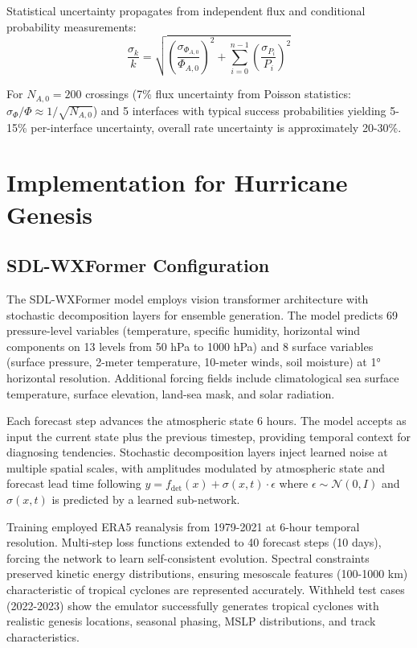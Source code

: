\documentclass[11pt]{article}
\begin{document}
Statistical uncertainty propagates from independent flux and conditional probability measurements:
\begin{equation}
\frac{\sigma_k}{k} = \sqrt{\left(\frac{\sigma_{\Phi_{A,0}}}{\Phi_{A,0}}\right)^2 + \sum_{i=0}^{n-1} \left(\frac{\sigma_{P_i}}{P_i}\right)^2}
\end{equation}

For $N_{A,0} = 200$ crossings (7\% flux uncertainty from Poisson statistics: $\sigma_{\Phi}/\Phi \approx 1/\sqrt{N_{A,0}}$) and 5 interfaces with typical success probabilities yielding 5-15\% per-interface uncertainty, overall rate uncertainty is approximately 20-30\%.
\section{Implementation for Hurricane Genesis}

\subsection{SDL-WXFormer Configuration}

The SDL-WXFormer model employs vision transformer architecture with stochastic decomposition layers for ensemble generation. The model predicts 69 pressure-level variables (temperature, specific humidity, horizontal wind components on 13 levels from 50 hPa to 1000 hPa) and 8 surface variables (surface pressure, 2-meter temperature, 10-meter winds, soil moisture) at 1° horizontal resolution. Additional forcing fields include climatological sea surface temperature, surface elevation, land-sea mask, and solar radiation.

Each forecast step advances the atmospheric state 6 hours. The model accepts as input the current state plus the previous timestep, providing temporal context for diagnosing tendencies. Stochastic decomposition layers inject learned noise at multiple spatial scales, with amplitudes modulated by atmospheric state and forecast lead time following $y = f_{\text{det}}(x) + \sigma(x,t) \cdot \epsilon$ where $\epsilon \sim \mathcal{N}(0,I)$ and $\sigma(x,t)$ is predicted by a learned sub-network.

Training employed ERA5 reanalysis from 1979-2021 at 6-hour temporal resolution. Multi-step loss functions extended to 40 forecast steps (10 days), forcing the network to learn self-consistent evolution. Spectral constraints preserved kinetic energy distributions, ensuring mesoscale features (100-1000 km) characteristic of tropical cyclones are represented accurately. Withheld test cases (2022-2023) show the emulator successfully generates tropical cyclones with realistic genesis locations, seasonal phasing, MSLP distributions, and track characteristics.
\end{document}
